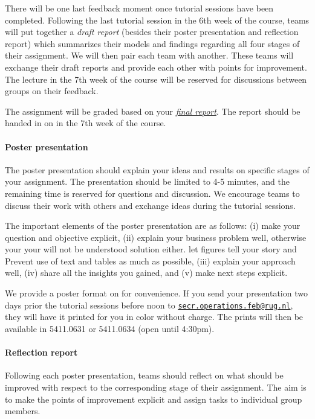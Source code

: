 \documentclass{article}
\begin{document}
There will be one last feedback moment once tutorial sessions have been completed. Following the last tutorial session in the 6th week of the course, teams will put together a \textit{draft report} (besides their poster presentation and reflection report) which summarizes their models and findings regarding all four stages of their assignment. We will then pair each team with another. These teams will exchange their draft reports and provide each other with points for improvement. The lecture in the 7th week of the course will be reserved for discussions between groups on their feedback. 

The assignment will be graded based on your \hyperref[par:final]{\textit{final report}}. The report should be handed in on \nestor in the 7th week of the course.

\paragraph{Poster presentation}
\label{par:presentation}

The poster presentation should explain your ideas and results on specific stages of your assignment. The presentation should be limited to 4-5 minutes, and the remaining time is reserved for questions and discussion. We encourage teams to discuss their work with others and exchange ideas during the tutorial sessions. 

The important elements of the poster presentation are as follows: (i) make your question and objective explicit, (ii) explain your business problem well, otherwise your your will not be understood solution either. let figures tell your story and Prevent use of text and tables as much as possible, (iii) explain your approach well, (iv) share all the insights you gained, and (v) make next steps explicit.

We provide a poster format on \nestor for convenience. If you send your presentation two days prior the tutorial sessions before noon to \href{mailto:secr.operations.feb@rug.nl}{\texttt{secr.operations.feb@rug.nl}}, they will have it printed for you in color without charge. The prints will then be available in 5411.0631 or 5411.0634 (open until 4:30pm).

\paragraph{Reflection report}
\label{par:reflection}

Following each poster presentation, teams should reflect on what should be improved with respect to the corresponding stage of their assignment. The aim is to make the points of improvement explicit and assign tasks to individual group members. 
\end{document}
